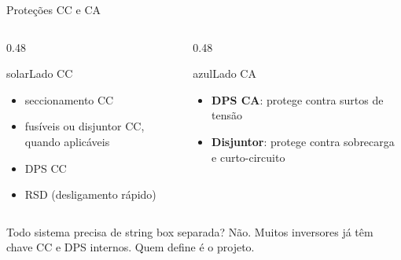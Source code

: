 \documentclass[aspectratio=169,10pt,xcolor=table]{beamer}
\newcommand{\frase}[1]{\vspace{0.1em}\begin{destaque}#1\end{destaque}}
\begin{document}
\begin{frame}{Proteções CC e CA}
  \begin{columns}[T]
    \begin{column}{0.48\textwidth}
      \begin{card}[equal height group=pr]{solar}{\faSolarPanel\enspace Lado CC}
        \begin{itemize}
          \item seccionamento CC
          \item fusíveis ou disjuntor CC, quando aplicáveis
          \item DPS CC
          \item RSD (desligamento rápido)
        \end{itemize}
      \end{card}
    \end{column}
    \begin{column}{0.48\textwidth}
      \begin{card}[equal height group=pr]{azul}{\faPlug\enspace Lado CA}
        \begin{itemize}
          \item \textbf{DPS CA}: protege contra surtos de tensão
          \item \textbf{Disjuntor}: protege contra sobrecarga e curto-circuito
        \end{itemize}
      \end{card}
    \end{column}
  \end{columns}
  \frase{Todo sistema precisa de string box separada? Não. Muitos inversores já têm chave CC e DPS internos. Quem define é o projeto.}
\end{frame}
\end{document}
